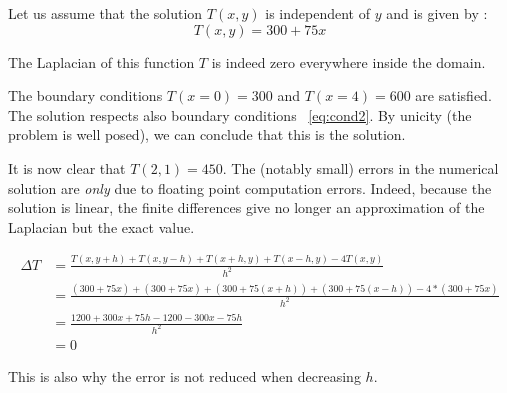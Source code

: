 \FloatBarrier

Let us assume that the solution $T(x,y)$ is independent of $y$ and is given by : 
$$T(x,y) = 300+75x$$

The Laplacian of this function $T$ is indeed zero everywhere inside the domain.

The boundary conditions $T(x=0)=300$ and $T(x=4)=600$ are satisfied. The solution respects also boundary conditions ~\eqref{eq:cond2}. By unicity (the problem is well posed), we can conclude that this is the solution.

 It is now clear that $T(2,1)=450$. The (notably small) errors in the numerical solution are \textit{only} due to floating point computation errors. Indeed, because the solution is linear, the finite differences give no longer an approximation of the Laplacian but the exact value. 
 
\begin{align*} 
 \Delta T &= \frac{T(x,y+h)+T(x,y-h)+T(x+h,y)+T(x-h,y)-4T(x,y)}{h^2}\\
 &=\frac{(300+75x)+(300+75x)+(300+75(x+h))+(300+75(x-h))-4*(300+75x)}{h^2}\\
 &=\frac{1200+300x+75h-1200-300x-75h}{h^2}\\
 &=0
 \end{align*}

This is also why the error is not reduced when decreasing $h$.